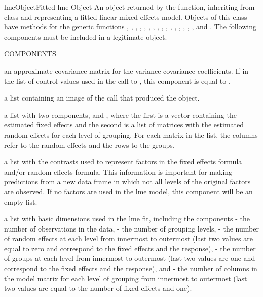 \documentclass[pdftex]{article} \usepackage{url,graphicx}
\begin{document}
\begin{Helpfile}{lmeObject}{Fitted lme Object}
An object returned by the  function, inheriting from class
 and representing a fitted linear mixed-effects
model. Objects of this class have methods for the generic functions 
, , , ,
, , ,
, , , ,
, , , ,
, and .
The following components must be included in a legitimate 
object. 
\begin{Argument}{COMPONENTS}
\item[\Co{apVar:}]
an approximate covariance matrix for the
variance-covariance coefficients. If  in the list
of control values used in the call to , this
component is equal to .
\item[\Co{call:}]
a list containing an image of the  call that
produced the object.
\item[\Co{coefficients:}]
a list with two components,  and
, where the first is a vector containing the estimated
fixed effects and the second is a list of matrices with the estimated
random effects for each level of grouping. For each matrix in the
 list, the columns refer to the random effects and the
rows to the groups.
\item[\Co{contrasts:}]
a list with the contrasts used to represent factors
in the fixed effects formula  and/or random effects formula. This
information is important for making predictions from a new data
frame in which not all levels of the original factors are
observed. If no factors are used in the lme model, this component
will be an empty list.
\item[\Co{dims:}]
a list with basic dimensions used in the lme fit,
including the components  - the number of observations in
the data,  - the number of grouping levels,  -
the number of random effects at each level from innermost to
outermost (last two values are equal to zero and correspond to the
fixed effects and the response),  - the number of groups
at each level from innermost to outermost (last two values are one
and correspond to the fixed effects and the response), and
 - the number of columns in the model matrix for each
level of grouping from innermost to outermost (last two values are
equal to the number of fixed effects and one).
\item[\Co{fitted:}]

\end{Argument}
\end{Helpfile}
\end{document}
